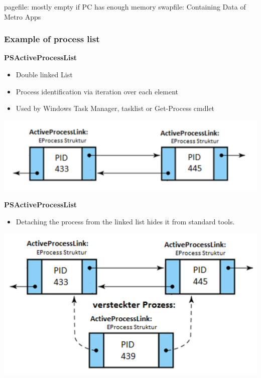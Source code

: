 pagefile: mostly empty if PC has enough memory
swapfile: Containing Data of Metro Apps

\subsubsection*{Example of process list}

\textbf{PSActiveProcessList}
\begin{itemize}
   \item Double linked List
   \item Process identification via iteration over each element
   \item Used by Windows Task Manager, tasklist or Get-Process cmdlet
\end{itemize}

\begin{center}
  \includegraphics[width=\textwidth]{resources/13-volatility-process-list.png}
\end{center}

\textbf{PSActiveProcessList}
\begin{itemize}
   \item Detaching the process from the linked list hides it from standard tools.
\end{itemize}

\begin{center}
  \includegraphics[width=\textwidth]{resources/13-volatility-process-list-2.png}
\end{center}

